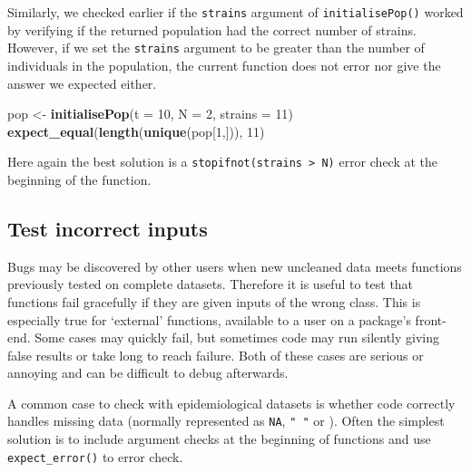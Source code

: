 \documentclass[10pt,letterpaper]{article}
\newenvironment{Shaded}{\begin{snugshade}}{\end{snugshade}}
\newcommand{\DataTypeTok}[1]{\textcolor[rgb]{0.13,0.29,0.53}{#1}}
\newcommand{\DecValTok}[1]{\textcolor[rgb]{0.00,0.00,0.81}{#1}}
\newcommand{\KeywordTok}[1]{\textcolor[rgb]{0.13,0.29,0.53}{\textbf{#1}}}
\newcommand{\NormalTok}[1]{#1}
\newcommand{\StringTok}[1]{\textcolor[rgb]{0.31,0.60,0.02}{#1}}
\begin{document}
Similarly, we checked earlier if the \texttt{strains} argument of \texttt{initialisePop()} worked by verifying if the returned population had the correct number of strains.
However, if we set the \texttt{strains} argument to be greater than the number of individuals in the population, the current function does not error nor give the answer we expected either.
\newline
{}\label{edge2}

\begin{Shaded}
\begin{Highlighting}[]
\NormalTok{pop <-}\StringTok{ }\KeywordTok{initialisePop}\NormalTok{(}\DataTypeTok{t =} \DecValTok{10}\NormalTok{, }\DataTypeTok{N =} \DecValTok{2}\NormalTok{, }\DataTypeTok{strains =} \DecValTok{11}\NormalTok{) }
\KeywordTok{expect_equal}\NormalTok{(}\KeywordTok{length}\NormalTok{(}\KeywordTok{unique}\NormalTok{(pop[}\DecValTok{1}\NormalTok{,])), }\DecValTok{11}\NormalTok{)}
\end{Highlighting}
\end{Shaded}

Here again the best solution is a \texttt{stopifnot(strains\ \textgreater{}\ N)} error check at the beginning of the function.

\hypertarget{testincorrect}{%
\subsection*{Test incorrect inputs}\label{testincorrect}}

Bugs may be discovered by other users when new uncleaned data meets functions previously tested on complete datasets.
Therefore it is useful to test that functions fail gracefully if they are given inputs of the wrong class.
This is especially true for `external' functions, available to a user on a package's front-end.
Some cases may quickly fail, but sometimes code may run silently giving false results or take long to reach failure.
Both of these cases are serious or annoying and can be difficult to debug afterwards.

A common case to check with epidemiological datasets is whether code correctly handles missing data (normally represented as \texttt{NA}, \texttt{"\ "} or \texttt{\textquotesingle{}\textquotesingle{}}).
Often the simplest solution is to include argument checks at the beginning of functions and use \texttt{expect\_error()} to error check.
\end{document}
